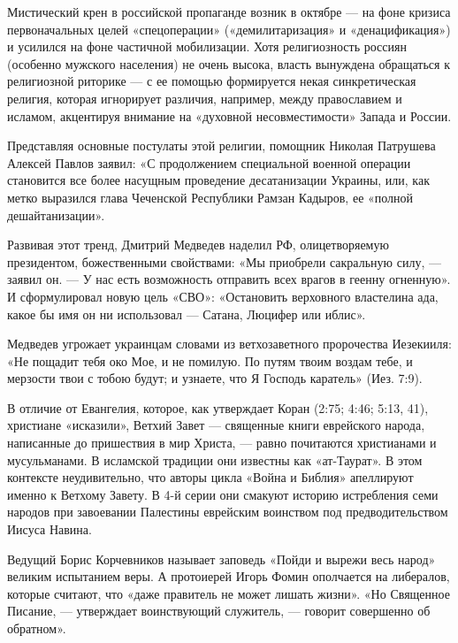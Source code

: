 Мистический крен в российской пропаганде возник в октябре — на фоне кризиса первоначальных целей «спецоперации» («демилитаризация» и «денацификация») и усилился на фоне частичной мобилизации. Хотя религиозность россиян (особенно мужского населения) не очень высока, власть вынуждена обращаться к религиозной риторике — с ее помощью формируется некая синкретическая религия, которая игнорирует различия, например, между православием и исламом, акцентируя внимание на «духовной несовместимости» Запада и России.

Представляя основные постулаты этой религии, помощник Николая Патрушева Алексей Павлов заявил: «С продолжением специальной военной операции становится все более насущным проведение десатанизации Украины, или, как метко выразился глава Чеченской Республики Рамзан Кадыров, ее «полной дешайтанизации».

Развивая этот тренд, Дмитрий Медведев наделил РФ, олицетворяемую президентом, божественными свойствами: «Мы приобрели сакральную силу, — заявил он. — У нас есть возможность отправить всех врагов в геенну огненную». И сформулировал новую цель «СВО»: «Остановить верховного властелина ада, какое бы имя он ни использовал — Сатана, Люцифер или иблис».

\begin{fancyquotes}
    Медведев угрожает украинцам словами из ветхозаветного пророчества Иезекииля: «Не пощадит тебя око Мое, и не помилую. По путям твоим воздам тебе, и мерзости твои с тобою будут; и узнаете, что Я Господь каратель» (Иез. 7:9).
\end{fancyquotes}

В отличие от Евангелия, которое, как утверждает Коран (2:75; 4:46; 5:13, 41), христиане «исказили», Ветхий Завет — священные книги еврейского народа, написанные до пришествия в мир Христа, — равно почитаются христианами и мусульманами. В исламской традиции они известны как «ат-Таурат». В этом контексте неудивительно, что авторы цикла «Война и Библия» апеллируют именно к Ветхому Завету. В 4-й серии они смакуют историю истребления семи народов при завоевании Палестины еврейским воинством под предводительством Иисуса Навина.

Ведущий Борис Корчевников называет заповедь «Пойди и вырежи весь народ» великим испытанием веры. А протоиерей Игорь Фомин ополчается на либералов, которые считают, что «даже правитель не может лишать жизни». «Но Священное Писание, — утверждает воинствующий служитель, — говорит совершенно об обратном».


